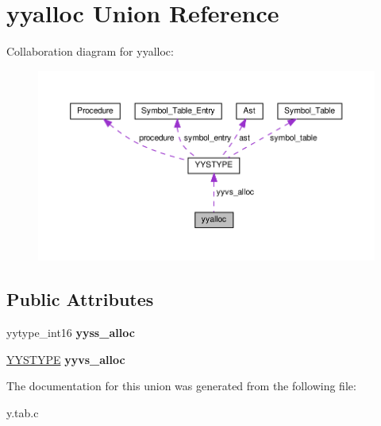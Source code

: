 \hypertarget{unionyyalloc}{}\section{yyalloc Union Reference}
\label{unionyyalloc}


Collaboration diagram for yyalloc\+:
\nopagebreak
\begin{figure}[H]
\begin{center}
\leavevmode
\includegraphics[width=350pt]{unionyyalloc__coll__graph}
\end{center}
\end{figure}
\subsection*{Public Attributes}
\begin{DoxyCompactItemize}
\item 
\mbox{\label{unionyyalloc_a4800e0520a89a4789afa7b5d82197e65}} 
yytype\+\_\+int16 {\bfseries yyss\+\_\+alloc}
\item 
\mbox{\label{unionyyalloc_a9326f4fdc6f737a929444427836d8928}} 
\hyperlink{unionYYSTYPE}{Y\+Y\+S\+T\+Y\+PE} {\bfseries yyvs\+\_\+alloc}
\end{DoxyCompactItemize}


The documentation for this union was generated from the following file\+:\begin{DoxyCompactItemize}
\item 
y.\+tab.\+c\end{DoxyCompactItemize}
